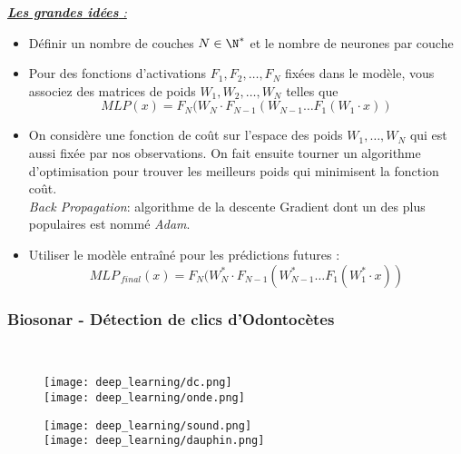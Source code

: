 \documentclass{beamer}
\theoremstyle{definition}
\begin{document}
\begin{frame}
	
	\underline{\textit{\textbf{Les grandes idées} :}}\\[0.25cm]
	\begin{itemize}
		\item Définir un nombre de couches $N \in \N^*$ et le nombre de neurones par couche
		\item Pour des fonctions d'activations $F_1,F_2,\dots,F_N$ fixées dans le modèle, vous associez des matrices de poids $W_1,W_2,\dots,W_N$ telles que 
		$$MLP(x) = F_N(W_N\cdot F_{N-1}(W_{N-1}\dots F_1(W_1\cdot x))$$
		\item On considère une fonction de coût sur l'espace des poids $W_1,\dots,W_N$ qui est aussi fixée par nos observations. On fait ensuite tourner un algorithme d'optimisation pour trouver les meilleurs poids qui minimisent la fonction coût. \\[0.25cm]
		
		\emph{Back Propagation}: algorithme de la descente Gradient dont un des plus populaires est nommé \emph{Adam}.
		
		\item Utiliser le modèle entraîné pour les prédictions futures : 
		$$MLP_{~final}(x) = F_N(W_N^*\cdot F_{N-1}(W_{N-1}^*\dots F_1(W_1^*\cdot x))$$ 
		
	\end{itemize}
\end{frame}

\begin{frame}	
\frametitle{Biosonar - Détection de clics d'Odontocètes}
\hfill\\[-1cm]
\begin{minipage}[t]{1\linewidth}
	\centering
	
	\begin{minipage}[t]{0.35\linewidth}
		\raggedright
		\begin{figure}
			\centering
			\texttt{[image: deep\_learning/dc.png]}\\[0.5cm]
			\texttt{[image: deep\_learning/onde.png]}
		\end{figure}			
	\end{minipage}
	\hfil\begin{minipage}[t]{0.5\linewidth}
		\raggedright
		\begin{figure}
			\centering
			\texttt{[image: deep\_learning/sound.png]}\\[0.5cm]
			\texttt{[image: deep\_learning/dauphin.png]}
		\end{figure}
	
	\end{minipage}
\end{minipage}
\end{frame}
\end{document}

